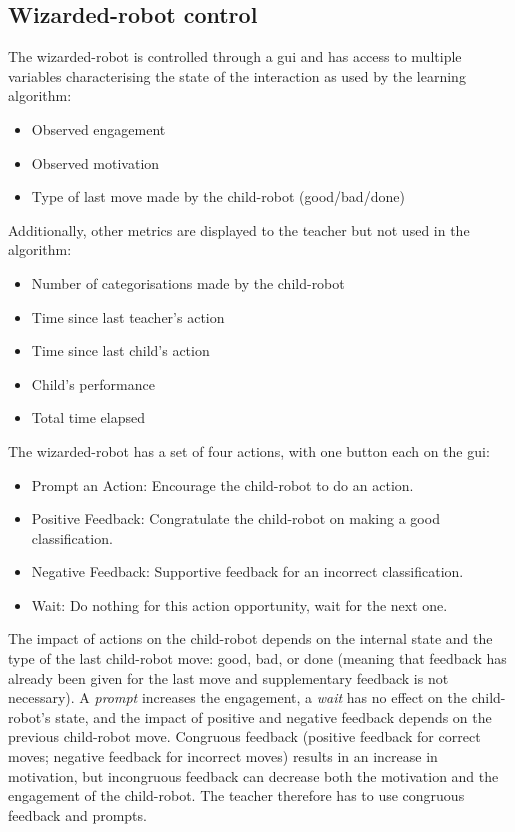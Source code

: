 \subsection{Wizarded-robot control}
\label{ssec:woz_wizarded_robot}
The wizarded-robot is controlled through a \gls{gui} and has access to multiple variables characterising the state of the interaction as used by the learning algorithm:
\begin{itemize}
	\item Observed engagement
	\item Observed motivation
	\item Type of last move made by the child-robot (good/bad/done)
\end{itemize}
Additionally, other metrics are displayed to the teacher but not used in the algorithm:
\begin{itemize}
	\item Number of categorisations made by the child-robot
	\item Time since last teacher's action
	\item Time since last child's action
	\item Child's performance
	\item Total time elapsed
\end{itemize}


The wizarded-robot has a set of four actions, with one button each on the \gls{gui}: 
\begin{itemize}
	\item Prompt an Action: Encourage the child-robot to do an action.
	\item Positive Feedback: Congratulate the child-robot on making a good classification.
	\item Negative Feedback: Supportive feedback for an incorrect classification.
	\item Wait: Do nothing for this action opportunity, wait for the next one.
\end{itemize}

The impact of actions on the child-robot depends on the internal state and the type of the last child-robot move: good, bad, or done (meaning that feedback has already been given for the last move and supplementary feedback is not necessary). A \textit{prompt} increases the engagement, a \textit{wait} has no effect on the child-robot's state, and the impact of positive and negative feedback depends on the previous child-robot move. Congruous feedback (positive feedback for correct moves; negative feedback for incorrect moves) results in an increase in motivation, but incongruous feedback can decrease both the motivation and the engagement of the child-robot. The teacher therefore has to use congruous feedback and prompts.

